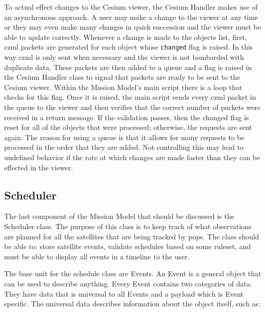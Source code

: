 To actual effect changes to the Cesium viewer, the Cesium Handler makes use of
an asynchronous approach. A user may make a change to the viewer at any time or
they may even make many changes in quick succession and the viewer must be able
to update correctly. Whenever a change is made to the objects list, first,
\gls{czml} packets are generated for each object whose \texttt{changed} flag is
raised. In this way \gls{czml} is only sent when necessary and the viewer is
not bombarded with duplicate data. These packets are then added to a queue and
a flag is raised in the Cesium Handler class to signal that packets are ready
to be sent to the Cesium viewer. Within the Mission Model's main script there
is a loop that checks for this flag. Once it is raised, the main script sends
every \gls{czml} packet in the queue to the viewer and then verifies that the
correct number of packets were received in a return message. If the validation
passes, then the changed flag is reset for all of the objects that were
processed; otherwise, the requests are sent again. The reason for using a queue
is that it allows for many requests to be processed in the order that they are
added.  Not controlling this may lead to undefined behavior if the rate at
which changes are made faster than they can be effected in the viewer.


\subsection{Scheduler}

The last component of the Mission Model that should be discussed is the
Scheduler class. The purpose of this class is to keep track of what
observations are planned for all the satellites that are being tracked by
\gls{pops}. The class should be able to: store satellite events, validate
schedules based on some ruleset, and must be able to display all events in a
timeline to the user. 

The base unit for the schedule class are Events. An Event is a general object
that can be used to describe anything. Every Event contains two categories of
data. They have data that is universal to all Events and a payload which is
Event specific.  The universal data describes information about the object
itself, such as:

